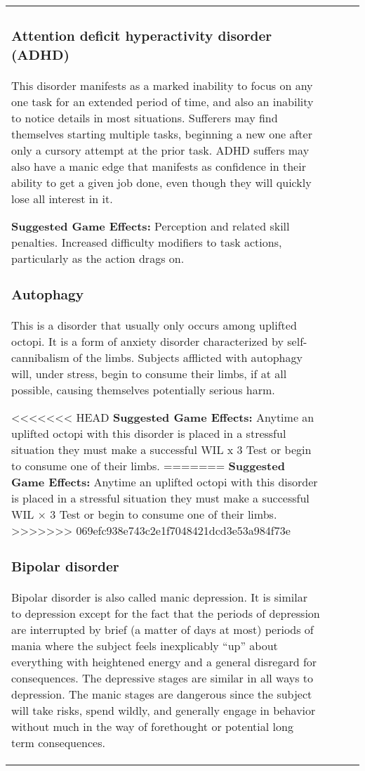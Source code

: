 \begin{table}
\begin{tabular}{|p{8cm}|r|r|r|}
\subsubsection{Attention deficit hyperactivity disorder (ADHD)} 

This disorder manifests as a marked inability to focus on any one task for an extended period of time, and also an inability to notice details in most situations. Sufferers may find themselves starting multiple tasks, beginning a new one after only a cursory attempt at the prior task. ADHD suffers may also have a manic edge that manifests as confidence in their ability to get a given job done, even though they will quickly lose all interest in it. 

\textbf{Suggested Game Effects:} Perception and related skill penalties. Increased difficulty modifiers to task actions, particularly as the action drags on. 

\subsubsection{Autophagy} 

This is a disorder that usually only occurs among uplifted octopi. It is a form of anxiety disorder characterized by self-cannibalism of the limbs. Subjects afflicted with autophagy will, under stress, begin to consume their limbs, if at all possible, causing themselves potentially serious harm. 

<<<<<<< HEAD \textbf{Suggested Game Effects:} Anytime an uplifted octopi with this disorder is placed in a stressful situation they must make a successful WIL x 3 Test or begin to consume one of their limbs. ======= \textbf{Suggested Game Effects:} Anytime an uplifted octopi with this disorder is placed in a stressful situation they must make a successful WIL $\times$ 3 Test or begin to consume one of their limbs. >>>>>>> 069efc938e743c2e1f7048421dcd3e53a984f73e 

\subsubsection{Bipolar disorder} 

Bipolar disorder is also called manic depression. It is similar to depression except for the fact that the periods of depression are interrupted by brief (a matter of days at most) periods of mania where the subject feels inexplicably ``up” about everything with heightened energy and a general disregard for consequences. The depressive stages are similar in all ways to depression. The manic stages are dangerous since the subject will take risks, spend wildly, and generally engage in behavior without much in the way of forethought or potential long term consequences. 


\end{tabular}
\end{table}
